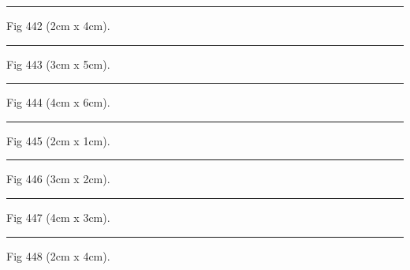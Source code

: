 \documentclass[a4paper,11pt]{article}
\begin{document}
\begin{swarmwrap}%
  \begin{minipage}[t]{2cm}
    \centering
    \rule{\linewidth}{4cm}
    {\footnotesize Fig 442 (2cm x 4cm).}
  \end{minipage}%
\end{swarmwrap}%
\swarmwrapnext
\lipsum[142]%

\begin{swarmwrap}%
  \begin{minipage}[t]{3cm}
    \centering
    \rule{\linewidth}{5cm}
    {\footnotesize Fig 443 (3cm x 5cm).}
  \end{minipage}%
\end{swarmwrap}%
\swarmwrapnext
\lipsum[143]%

\begin{swarmwrap}%
  \begin{minipage}[t]{4cm}
    \centering
    \rule{\linewidth}{6cm}
    {\footnotesize Fig 444 (4cm x 6cm).}
  \end{minipage}%
\end{swarmwrap}%
\swarmwrapnext
\lipsum[144]%

\begin{swarmwrap}%
  \begin{minipage}[t]{2cm}
    \centering
    \rule{\linewidth}{1cm}
    {\footnotesize Fig 445 (2cm x 1cm).}
  \end{minipage}%
\end{swarmwrap}%
\swarmwrapnext
\lipsum[145]%

\begin{swarmwrap}%
  \begin{minipage}[t]{3cm}
    \centering
    \rule{\linewidth}{2cm}
    {\footnotesize Fig 446 (3cm x 2cm).}
  \end{minipage}%
\end{swarmwrap}%
\swarmwrapnext
\lipsum[146]%

\begin{swarmwrap}%
  \begin{minipage}[t]{4cm}
    \centering
    \rule{\linewidth}{3cm}
    {\footnotesize Fig 447 (4cm x 3cm).}
  \end{minipage}%
\end{swarmwrap}%
\swarmwrapnext
\lipsum[147]%

\begin{swarmwrap}%
  \begin{minipage}[t]{2cm}
    \centering
    \rule{\linewidth}{4cm}
    {\footnotesize Fig 448 (2cm x 4cm).}
  \end{minipage}%
\end{swarmwrap}%
\swarmwrapnext
\lipsum[148]%
\end{document}
